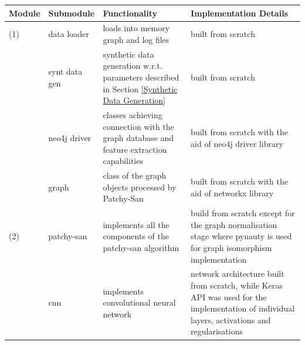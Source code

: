 \begin{longtable}{|p{}|p{}|p{}|p{}|}
  \hline
  \textbf{Module} & \textbf{Submodule} & \textbf{Functionality}                                                                                          & \textbf{Implementation Details}                                                                                                                \\
  \hline
  \hline

  (1)             & data loader        & loads into memory graph and log files                                                                           & built from scratch                                                                                                                             \\

                  & synt data gen      & synthetic data generation w.r.t. parameters described in Section \ref{Synthetic Data Generation}                & built from scratch                                                                                                                             \\

                  & neo4j driver       & classes achieving connection with the graph database and feature extraction capabilities                        & built from scratch with the aid of neo4j driver library                                                                                        \\

                  & graph              & class of the graph objects processed by Patchy-San                                                              & built from scratch with the aid of networkx library                                                                                            \\
  \hline


  (2)             & patchy-san         & implements all the components of the patchy-san algorithm                                                       & build from scratch except for the graph normalisation stage where pynauty is used for graph isomorphism implementation                         \\

                  & cnn                & implements convolutional neural network                                                                         & network architecture built from scratch, while Keras API was used for the implementation of individual layers, activations and regularisations \\


\end{longtable}
